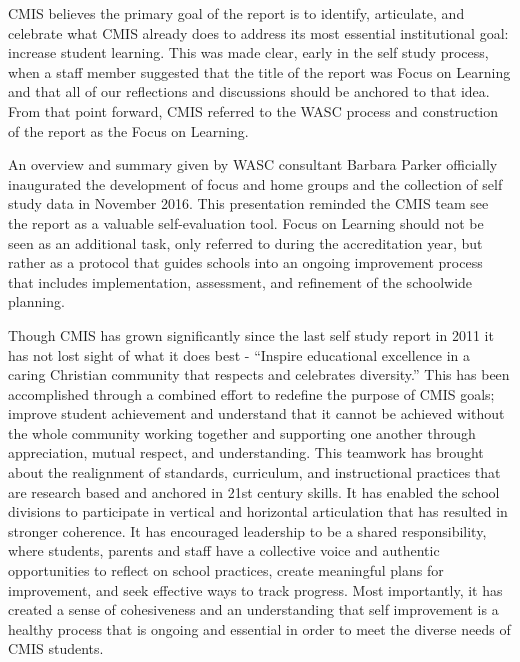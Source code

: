 CMIS believes the primary goal of the report is to identify, articulate, and celebrate what CMIS already does to address its most essential institutional goal: increase student learning. This was made clear, early in the self study process, when a staff member suggested that the title of the report was Focus on Learning and that all of our reflections and discussions should be anchored to that idea. From that point forward, CMIS referred to the WASC process and construction of the report as the Focus on Learning. 

An overview and summary given by WASC consultant Barbara Parker officially inaugurated the development of focus and home groups and the collection of self study data in November 2016. This presentation reminded the CMIS team see the report as a valuable self-evaluation tool. Focus on Learning should not be seen as an additional task, only referred to during the accreditation year, but rather as a protocol that guides schools into an ongoing improvement process that includes implementation, assessment, and refinement of the schoolwide planning.

Though CMIS has grown significantly since the last self study report in 2011 it has not lost sight of what it does best - “Inspire educational excellence in a caring Christian community that respects and celebrates diversity.” This has been accomplished through a combined effort to redefine the purpose of CMIS goals; improve student achievement and understand that it cannot be achieved without the whole community working together and supporting one another through appreciation, mutual respect, and understanding. This teamwork has brought about the realignment of standards, curriculum, and instructional practices that are research based and anchored in 21st century skills. It has enabled the school divisions to participate in vertical and horizontal articulation that has resulted in stronger coherence. It has encouraged leadership to be a shared responsibility, where students, parents and staff have a collective voice and authentic opportunities to reflect on school practices, create meaningful plans for improvement, and seek effective ways to track progress. Most importantly, it has created a sense of cohesiveness and an understanding that self improvement is a healthy process that is ongoing and essential in order to meet the diverse needs of CMIS students.



